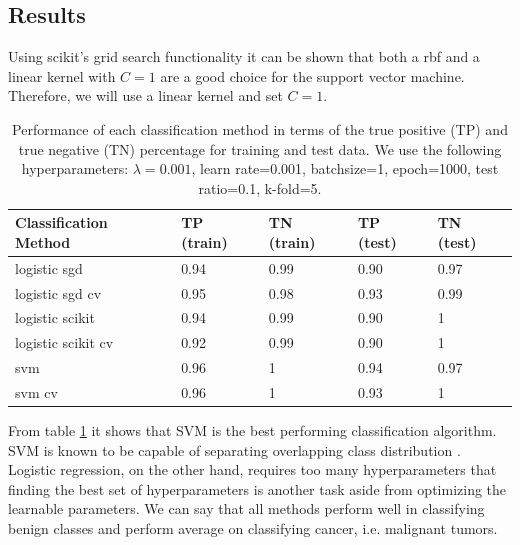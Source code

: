 \subsection{Results} \label{subsec:results_logistic_regression}
Using scikit's grid search functionality it can be shown that both a rbf and a linear kernel with $C=1$ are a good choice for the support vector machine. Therefore, we will use a linear kernel and set $C=1$. 

\begin{table}[H]
\begin{tabular}{@{}lllll@{}}
\toprule
Classification Method                   & TP (train) & TN (train)   & TP (test)   & TN (test)   \\ \midrule
logistic sgd                            & 0.94      & 0.99 & 0.90 & 0.97 \\
logistic sgd cv                         & 0.95      & 0.98 & 0.93 & 0.99 \\
logistic scikit                         & 0.94      & 0.99 & 0.90 & 1    \\
logistic scikit cv                      & 0.92      & 0.99 & 0.90 & 1    \\
svm                                     & 0.96      & 1    & 0.94 & 0.97 \\
svm cv                                  & 0.96      & 1    & 0.93 & 1   \\ \bottomrule
\end{tabular}
\caption{Performance of each classification method in terms of the true positive (TP) and true negative (TN) percentage for training and test data. We use the following hyperparameters: $\lambda=0.001$, learn rate=0.001, batchsize=1, epoch=1000, test ratio=0.1, k-fold=5.}  
\label{table:1}
\end{table}


From table \ref{table:1} it shows that SVM is the best performing classification algorithm. SVM is known to be capable of separating overlapping class distribution \cite{bishop2006pattern}. Logistic regression, on the other hand, requires too many hyperparameters that finding the best set of hyperparameters is another task aside from optimizing the learnable parameters. We can say that all methods perform well in classifying benign classes and perform average on classifying cancer, i.e. malignant tumors. 


